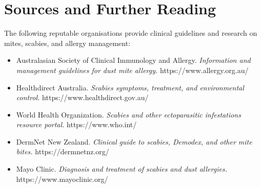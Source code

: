 \section*{Sources and Further Reading}
The following reputable organisations provide clinical guidelines and research on mites, scabies, and allergy management:
\begin{itemize}
    \item Australasian Society of Clinical Immunology and Allergy. \textit{Information and management guidelines for dust mite allergy.} https://www.allergy.org.au/
    \item Healthdirect Australia. \textit{Scabies symptoms, treatment, and environmental control.} https://www.healthdirect.gov.au/
    \item World Health Organization. \textit{Scabies and other ectoparasitic infestations resource portal.} https://www.who.int/
    \item DermNet New Zealand. \textit{Clinical guide to scabies, Demodex, and other mite bites.} https://dermnetnz.org/
    \item Mayo Clinic. \textit{Diagnosis and treatment of scabies and dust allergies.} https://www.mayoclinic.org/
\end{itemize}
